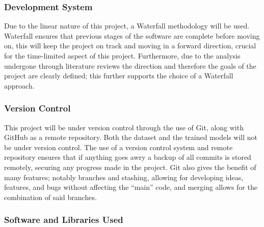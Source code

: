 \documentclass[12pt]{article}
\begin{document}
\subsubsection{Development System}

Due to the linear nature of this project, a Waterfall methodology will be used. Waterfall ensures that previous stages of the software are complete before moving on, this will keep the project on track and moving in a forward direction, crucial for the time-limited aspect of this project. Furthermore, due to the analysis undergone through literature reviews the direction and therefore the goals of the project are clearly defined; this further supports the choice of a Waterfall approach.

\subsubsection{Version Control}

This project will be under version control through the use of Git, along with GitHub as a remote repository. Both the dataset and the trained models will not be under version control. The use of a version control system and remote repository ensures that if anything goes awry a backup of all commits is stored remotely, securing any progress made in the project. Git also gives the benefit of many features; notably branches and stashing, allowing for developing ideas, features, and bugs without affecting the ``main'' code, and merging allows for the combination of said branches.

\subsubsection{Software and Libraries Used}
\end{document}
